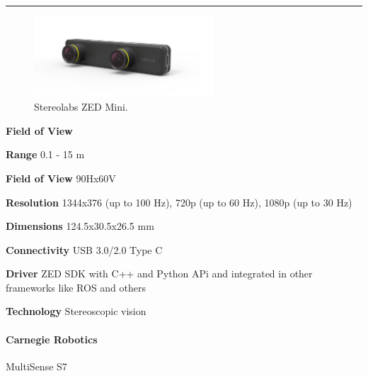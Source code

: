 \documentclass[../main.tex]{subfiles}
\begin{document}
\noindent\rule{8cm}{0.1pt}
\begin{figure}[H]
    \centering
    \includegraphics[width=0.6\textwidth]{images/zed-mini.jpg}
    \caption{Stereolabs ZED Mini.}
    \label{fig:zed_mini}
\end{figure}
\begin{labeling}{\textbf{Field of View    }}
    \setlength{\itemindent}{2em}
    \item [\textbf{Range}] 0.1 - 15 m
    \item [\textbf{Field of View}] 90Hx60V
    \item [\textbf{Resolution}] 1344x376 (up to 100 Hz), 720p (up to 60 Hz), 1080p (up to 30 Hz)
    \item [\textbf{Dimensions}] 124.5x30.5x26.5 mm
    \item [\textbf{Connectivity}] USB 3.0/2.0 Type C
    \item [\textbf{Driver}] ZED SDK with C++ and Python APi and integrated in other frameworks like ROS and others
    \item [\textbf{Technology}] Stereoscopic vision
\end{labeling}
\vspace{1em}
\paragraph{\large \textbf{Carnegie Robotics}} {\large MultiSense S7}
\end{document}
